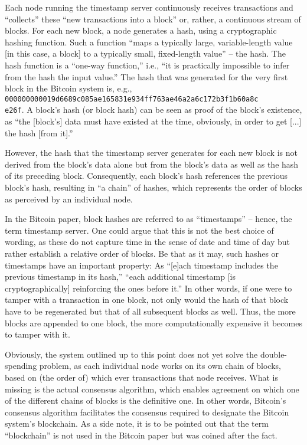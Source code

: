 Each node running the timestamp server continuously receives transactions and ``collects'' these ``new transactions into a block'' or, rather, a continuous stream of blocks. \autocite[3]{nakamoto2008}
For each new block, a node generates a hash, using a cryptographic hashing function.
Such a function ``maps a typically large, variable-length value [in this case, a block] to a typically small, fixed-length value'' -- the hash. \autocite[6]{baerenfaenger2020a}
The hash function is a ``one-way function,'' i.e., ``it is practically impossible to infer from the hash the input value.'' \autocite[6]{baerenfaenger2020a}
The hash that was generated for the very first block in the Bitcoin system is, e.g., \texttt{000000000019d6689c085ae165831e934ff763ae46a2a6c172b3f1b60a8c \\ e26f}. \autocite{blockchaincom2020}
A block's hash (or block hash) can be seen as proof of the block's existence, as ``the [block's] data must have existed at the time, obviously, in order to get [...] the hash [from it].'' \autocite[2]{nakamoto2008}

However, the hash that the timestamp server generates for each new block is not derived from the block's data alone but from the block's data as well as the hash of its preceding block.
Consequently, each block's hash references the previous block's hash, resulting in ``a chain'' \autocite[2]{nakamoto2008} of hashes, which represents the order of blocks as perceived by an individual node.

In the Bitcoin paper, block hashes are referred to as ``timestamps'' \autocite{nakamoto2008} -- hence, the term timestamp server.
One could argue that this is not the best choice of wording, as these do not capture time in the sense of date and time of day but rather establish a relative order of blocks.
Be that as it may, such hashes or timestamps have an important property:
As ``[e]ach timestamp includes the previous timestamp in its hash,'' ``each additional timestamp [is cryptographically] reinforcing the ones before it.'' \autocite[2]{nakamoto2008}
In other words, if one were to tamper with a transaction in one block, not only would the hash of that block have to be regenerated but that of all subsequent blocks as well.
Thus, the more blocks are appended to one block, the more computationally expensive it becomes to tamper with it.

Obviously, the system outlined up to this point does not yet solve the double-spending problem, as each individual node works on its own chain of blocks, based on (the order of) which ever transactions that node receives.
What is missing is the actual consensus algorithm, which enables agreement on which one of the different chains of blocks is the definitive one.
In other words, Bitcoin's consensus algorithm facilitates the consensus required to designate the Bitcoin system's blockchain.
As a side note, it is to be pointed out that the term ``blockchain'' is not used in the Bitcoin paper but was coined after the fact.

